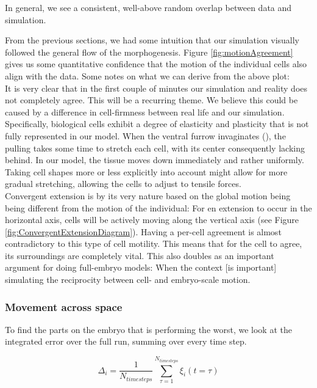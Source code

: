 In general, we see a consistent, well-above random overlap between data and simulation. 

From the previous sections, we had some intuition that our simulation visually followed the general flow of the morphogenesis. Figure \ref{fig:motionAgreement} gives us some quantitative confidence that the motion of the individual cells also align with the data. 
Some notes on what we can derive from the above plot:\\

It is very clear that in the first couple of minutes our simulation and reality does not completely agree. This will be a recurring theme. We believe this could be caused by a difference in cell-firmness between real life and our simulation. Specifically, biological cells exhibit a degree of elasticity and plasticity that is not fully represented in our model. When the ventral furrow invaginates (), the pulling takes some time to stretch each cell, with its center consequently lacking behind. In our model, the tissue moves down immediately and rather uniformly. Taking cell shapes more or less explicitly into account might allow for more gradual stretching, allowing the cells to adjust to tensile forces.\\

Convergent extension is by its very nature based on the global motion being being different from the motion of the individual: For en extension to occur in the horizontal axis, cells will be actively moving along the vertical axis (see Figure \ref{fig:ConvergentExtensionDiagram}). Having a per-cell agreement is almost contradictory to this type of cell motility. This means that for the cell to agree, its surroundings are completely vital. This also doubles as an important argument for doing full-embryo models: When the context [is important] simulating the reciprocity between cell- and embryo-scale motion.\reph\\



\subsubsection{Movement across space}

To find the parts on the embryo that is performing the worst, we look at the integrated error over the full run, summing over every time step.

\begin{equation}
     \label{eq:Delta-measure}
     \Delta_i = \frac{1}{N_{timesteps}}\sum_{\tau = 1}^{N_{timesteps}}\xi_i(t=\tau)
\end{equation}

